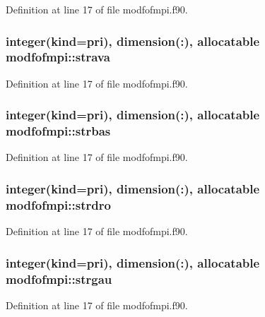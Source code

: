 Definition at line 17 of file modfofmpi.\-f90.

\hypertarget{classmodfofmpi_a2cc07767e1b2a2462fc2eeaaef5f5b0a}{
\subsubsection[{strava}]{\setlength{\rightskip}{0pt plus 5cm}integer(kind=pri), dimension(\-:), allocatable modfofmpi\-::strava}}\label{classmodfofmpi_a2cc07767e1b2a2462fc2eeaaef5f5b0a}


Definition at line 17 of file modfofmpi.\-f90.

\hypertarget{classmodfofmpi_a18f63a61d3cf10a560030f18385646d6}{
\subsubsection[{strbas}]{\setlength{\rightskip}{0pt plus 5cm}integer(kind=pri), dimension(\-:), allocatable modfofmpi\-::strbas}}\label{classmodfofmpi_a18f63a61d3cf10a560030f18385646d6}


Definition at line 17 of file modfofmpi.\-f90.

\hypertarget{classmodfofmpi_a6f52fb3f19368ce1dbad562162f6d4b5}{
\subsubsection[{strdro}]{\setlength{\rightskip}{0pt plus 5cm}integer(kind=pri), dimension(\-:), allocatable modfofmpi\-::strdro}}\label{classmodfofmpi_a6f52fb3f19368ce1dbad562162f6d4b5}


Definition at line 17 of file modfofmpi.\-f90.

\hypertarget{classmodfofmpi_a59d3a040e03ea0312701cf16ded04071}{
\subsubsection[{strgau}]{\setlength{\rightskip}{0pt plus 5cm}integer(kind=pri), dimension(\-:), allocatable modfofmpi\-::strgau}}\label{classmodfofmpi_a59d3a040e03ea0312701cf16ded04071}


Definition at line 17 of file modfofmpi.\-f90.

